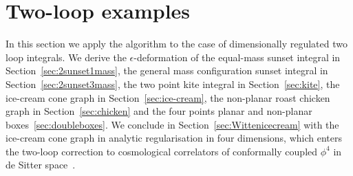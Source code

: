 \documentclass[a4paper,12pt]{article}
\numberwithin{equation}{section}
\numberwithin{figure}{section}
\begin{document}
\section{Two-loop examples}\label{sec:twoloop}
%
In this section we apply the algorithm to  the case of dimensionally
 regulated two loop integrals. We derive the $\epsilon$-deformation of
the equal-mass sunset integral in Section~\ref{sec:2sunset1mass}, the general mass configuration
sunset integral in Section~\ref{sec:2sunset3mass}, the two point kite
integral in Section~\ref{sec:kite}, the ice-cream cone
graph in Section~\ref{sec:ice-cream}, the non-planar roast chicken
graph in Section~\ref{sec:chicken} and the four points planar
and non-planar boxes~\ref{sec:doubleboxes}. We conclude in  Section~\ref{sec:Wittenicecream}
with the ice-cream cone graph in  analytic regularisation in four
dimensions, which enters the two-loop correction to cosmological
correlators of  conformally coupled $\phi^4$  in  de
 Sitter space~\cite{Chowdhury:2023arc}.
\end{document}
